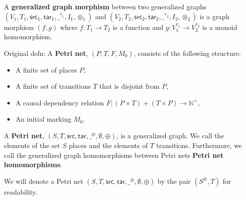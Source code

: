 \begin{definition}
  \label{Petri-net-morphism}
  A \textbf{generalized graph morphism} between two generalized graphs\\
  $(V_1, T_1, \mathsf{src_1}, \mathsf{tar_1}, \_^{*_1},I_1,\otimes_1)$ and
  $(V_2, T_2, \mathsf{src_2}, \mathsf{tar_2}, \_^{*_2},I_2,\otimes_2)$ is a graph morphism
  $(f, g)$ where $f : T_1 \to T_2$ is a function and
  $g: V_1^{*_1} \to V_2^{*_2}$ is a monoid homomorphism.
\end{definition}

\begin{definition}
  \label{def:Original-Petri-Net}
  Original defn: A \textbf{Petri net}, $(P, T, F, M_0)$, consists of the following structure:  
  \begin{itemize}
  \item A finite set of places $P$,
  \item A finite set of transitions $T$ that is disjoint from $P$,
  \item A causal dependency relation $F: (P \times T) + (T \times P) \to \mathbb{N}^+ $, 
  \item An initial marking $M_0$.
  \end{itemize}
\end{definition}
%
\begin{definition}
  \label{def:Petri-Net}
  A \textbf{Petri net}, $(S, T, \mathsf{src},
  \mathsf{tar},\_^{\oplus},\emptyset,\oplus)$, is a generalized graph.  We call
  the elements of the set $S$ places and the elements of $T$
  transitions.  Furthermore, we call the generalized graph
  homomorphisms between Petri nets \textbf{Petri net homomorphisms}.
\end{definition}
We will denote a Petri net $(S, T, \mathsf{src},
\mathsf{tar},\_^{\oplus},\emptyset,\oplus)$ by the pair $(S^\oplus,T)$ for
readability. %
%
